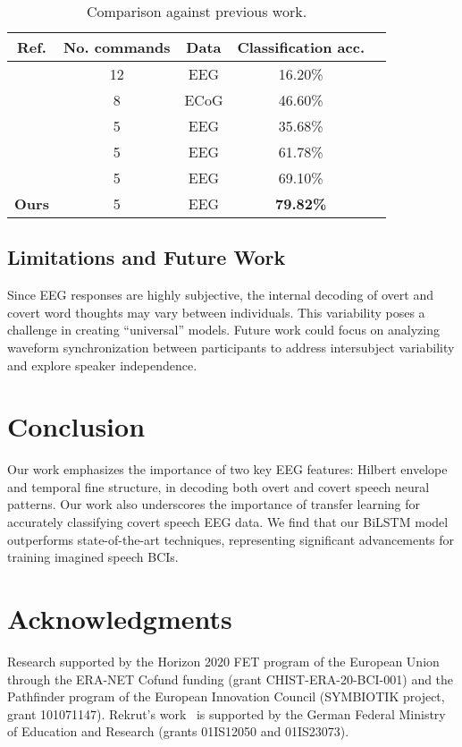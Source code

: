\documentclass[onecolumn]{IEEEtran}
\begin{document}
\begin{table}[!ht]
\caption{Comparison against previous work.}
\begin{center}
    \begin{tabular}{*5c}
    \toprule
    \textbf{Ref.} & \textbf{No. commands} & \textbf{Data} & \textbf{Classification acc.} \\
    \midrule
    \cite{lee2020eeg} & 12 & EEG   & 16.20\% \\
    \cite{komeiji2024feasibility} & 8  & ECoG  & 46.60\% \\
    \cite{cooney2019optimizing} & 5  & EEG   & 35.68\% \\
    \cite{rekrut2022improving} & 5  & EEG   & 61.78\% \\
    \cite{mohamed2024speech} & 5  & EEG   & 69.10\% \\
    \textbf{Ours} & 5 & EEG & \textbf{79.82\%} \\
    \bottomrule
    \end{tabular}
\label{tab:comparison}
\end{center}
\end{table}

\subsection{Limitations and Future Work}

Since EEG responses are highly subjective, the internal decoding of overt and covert word thoughts may vary between individuals. 
This variability poses a challenge in creating ``universal'' models. 
Future work could focus on analyzing waveform synchronization between participants
to address intersubject variability and explore speaker independence.

\section{Conclusion}
\label{sec:conclusion}

Our work emphasizes the importance of two key EEG features: Hilbert envelope and temporal fine structure, 
in decoding both overt and covert speech neural patterns. 
Our work also underscores the importance of transfer learning for accurately classifying covert speech EEG data.
We find that our BiLSTM model outperforms state-of-the-art techniques, 
representing significant advancements for training imagined speech BCIs.

\section*{Acknowledgments}
Research supported by the Horizon 2020 FET program of the European Union 
through the ERA-NET Cofund funding (grant CHIST-ERA-20-BCI-001)
and the Pathfinder program of the European Innovation Council (SYMBIOTIK project, grant 101071147). 
Rekrut’s work~\cite{rekrut2022improving} is supported by the German Federal Ministry of Education and Research (grants 01IS12050 and 01IS23073).

\balance


\end{document}
